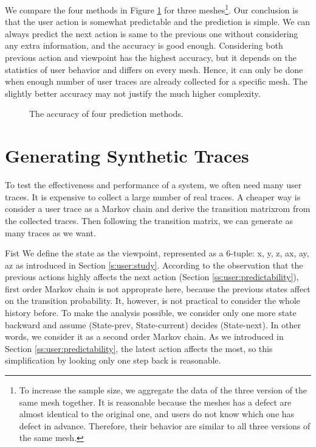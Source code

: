 We compare the four methods in Figure \ref{f:user:accuracy_comp} for three meshes\footnote{
To increase the sample size, we aggregate the data of the three version of the same mesh together.
It is reasonable because the meshes has a defect are almost identical to the original one, 
and users do not know which one has defect in advance. Therefore, their behavior are similar to
all three versions of the same mesh.}.
Our conclusion is that the user action is somewhat predictable and the prediction is simple.
We can always predict the next action is same to the previous one without considering
any extra information, and the accuracy is good enough. 
Considering both previous action and viewpoint has the highest accuracy,
but it depends on the statistics of user behavior and differs on every mesh. Hence, it can only 
be done when enough number of user traces are already collected for a specific mesh. 
The slightly better accuracy may not justify the much higher complexity.
\begin{figure}
    \centering
    \caption{The accuracy of four prediction methods.}
    \label{f:user:accuracy_comp}
\end{figure}

\section{Generating Synthetic Traces}
To test the effectiveness and performance of a system, we often need many user traces. 
It is expensive to collect a large number of real traces. 
A cheaper way is consider a user trace as a Markov chain
and derive the transition matrixrom from the collected traces.
Then following the transition matrix, we can generate as many traces as we want.

Fist We define the state as the viewpoint, represented as a 6-tuple: {x, y, z, ax, ay, az}
as introduced in Section \ref{s:user:study}.
According to the observation that the previous actions highly affects the next action
(Section \ref{ss:user:predictability}),
first order Markov chain is not approprate here, because
the previous states affect on the transition probability. 
It, however, is not practical to consider the whole history before. 
To make the analysis possible, we consider only one more state backward and assume
(State-prev, State-current) decides (State-next). In other words, we consider it as a second order Markov chain. 
As we introduced in Section \ref{ss:user:predictability}, the latest action affects the most, so
this simplification by looking only one step back is reasonable.

